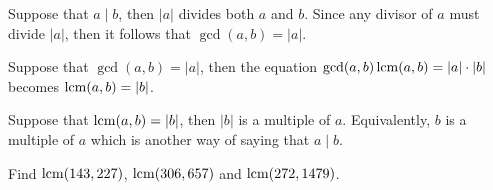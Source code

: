 \begin{solution}
    Suppose that $a \mid b$, then $|a|$ divides both $a$ and $b$. Since any divisor of $a$ must divide $|a|$, then it follows that $\gcd(a,b) = |a|$.

    Suppose that $\gcd(a,b) = |a|$, then the equation $\gcd(a,b) \operatorname{lcm}(a,b) = |a| \cdot |b|$ becomes $\operatorname{lcm}(a,b) = |b|$.

    Suppose that $\operatorname{lcm}(a,b) = |b|$, then $|b|$ is a multiple of $a$. Equivalently, $b$ is a multiple of $a$ which is another way of saying that $a \mid b$. \\
\end{solution}

\begin{exercise}
    Find $\operatorname{lcm}(143, 227)$, $\operatorname{lcm}(306, 657)$ and $\operatorname{lcm}(272, 1479)$. \\
\end{exercise}

